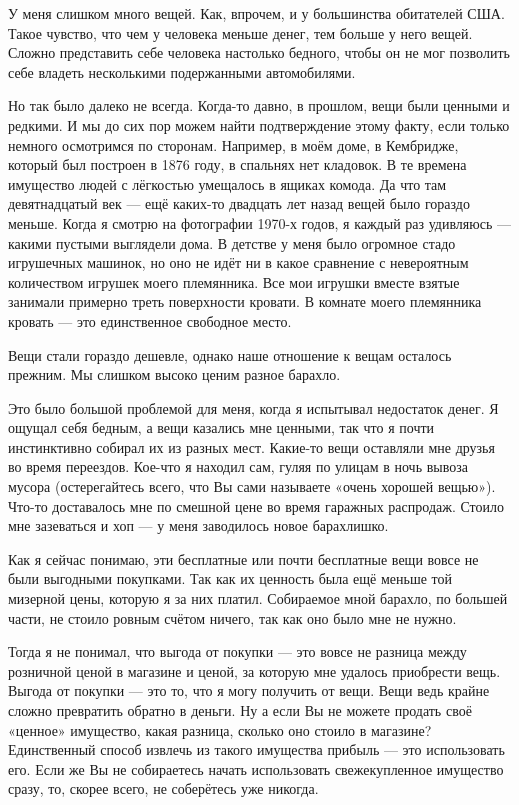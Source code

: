 \documentclass[ebook,12pt,oneside,openany]{memoir}
\begin{document}
\maketitle

У меня слишком много вещей. Как, впрочем, и у большинства обитателей
США. Такое чувство, что чем у человека меньше денег, тем больше у него
вещей. Сложно представить себе человека настолько бедного, чтобы он не
мог позволить себе владеть несколькими подержанными автомобилями.

Но так было далеко не всегда. Когда-то давно, в прошлом, вещи были
ценными и редкими. И мы до сих пор можем найти подтверждение этому
факту, если только немного осмотримся по сторонам. Например, в моём
доме, в Кембридже, который был построен в 1876 году, в спальнях нет
кладовок. В те времена имущество людей с лёгкостью умещалось в ящиках
комода. Да что там девятнадцатый век — ещё каких-то двадцать лет назад
вещей было гораздо меньше. Когда я смотрю на фотографии 1970-х годов,
я каждый раз удивляюсь — какими пустыми выглядели дома. В детстве у
меня было огромное стадо игрушечных машинок, но оно не идёт ни в какое
сравнение с невероятным количеством игрушек моего племянника. Все мои
игрушки вместе взятые занимали примерно треть поверхности кровати. В
комнате моего племянника кровать — это единственное свободное место.

Вещи стали гораздо дешевле, однако наше отношение к вещам осталось
прежним. Мы слишком высоко ценим разное барахло.

Это было большой проблемой для меня, когда я испытывал недостаток
денег. Я ощущал себя бедным, а вещи казались мне ценными, так что я
почти инстинктивно собирал их из разных мест. Какие-то вещи оставляли
мне друзья во время переездов. Кое-что я находил сам, гуляя по улицам
в ночь вывоза мусора (остерегайтесь всего, что Вы сами называете
«очень хорошей вещью»). Что-то доставалось мне по смешной цене во
время гаражных распродаж. Стоило мне зазеваться и хоп — у меня
заводилось новое барахлишко.

Как я сейчас понимаю, эти бесплатные или почти бесплатные вещи вовсе
не были выгодными покупками. Так как их ценность была ещё меньше той
мизерной цены, которую я за них платил. Собираемое мной барахло, по
большей части, не стоило ровным счётом ничего, так как оно было мне не
нужно.

Тогда я не понимал, что выгода от покупки — это вовсе не разница между
розничной ценой в магазине и ценой, за которую мне удалось приобрести
вещь. Выгода от покупки — это то, что я могу получить от вещи. Вещи
ведь крайне сложно превратить обратно в деньги. Ну а если Вы не можете
продать своё «ценное» имущество, какая разница, сколько оно стоило в
магазине? Единственный способ извлечь из такого имущества прибыль —
это использовать его. Если же Вы не собираетесь начать использовать
свежекупленное имущество сразу, то, скорее всего, не соберётесь уже
никогда.
\end{document}
